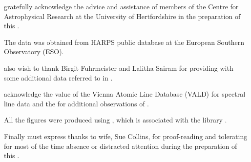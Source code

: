 {\FirstP} gratefully acknowledge the advice and assistance of members of the Centre for Astrophysical Research at the
University of Hertfordshire in the preparation of this {\paperorthesis}.  

The {\harps} data was obtained from HARPS public database at the European Southern Observatory (ESO).

{\FirstP} also wish to thank Birgit Fuhrmeister and Lalitha Sairam for providing {\Firstobj} with some additional data
referred to in \citet{fuhrmeister11}.

{\FirstP} acknowledge the value of the Vienna Atomic Line Database (VALD) for spectral line data and the {\asas} for
additional observations of {\prox}.

All the figures were produced using \matplot, which is associated with the {\scipy} library \citep{jones01}.

Finally  must express  thanks to  wife,
Sue Collins, for proof-reading and tolerating for most of the time  absence or distracted
attention during the preparation of this \paperorthesis.
